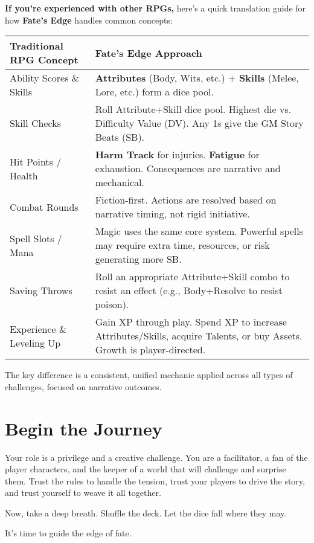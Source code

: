 \begin{tcolorbox}[enhanced, sharp corners, boxrule=1pt, colback=blue!5!white, colframe=blue!75!black, title={A Guide for Veterans: Fate's Edge in a Nutshell}]
\textbf{If you're experienced with other RPGs,} here's a quick translation guide for how \textbf{Fate's Edge} handles common concepts:

\begin{center}
\begin{tabular}{|p{6cm}|p{6cm}|}
\hline
\textbf{Traditional RPG Concept} & \textbf{Fate's Edge Approach} \\
\hline
Ability Scores \& Skills & \textbf{Attributes} (Body, Wits, etc.) + \textbf{Skills} (Melee, Lore, etc.) form a dice pool. \\
\hline
Skill Checks & Roll Attribute+Skill dice pool. Highest die vs. Difficulty Value (DV). Any 1s give the GM Story Beats (SB). \\
\hline
Hit Points / Health & \textbf{Harm Track} for injuries. \textbf{Fatigue} for exhaustion. Consequences are narrative and mechanical. \\
\hline
Combat Rounds & Fiction-first. Actions are resolved based on narrative timing, not rigid initiative. \\
\hline
Spell Slots / Mana & Magic uses the same core system. Powerful spells may require extra time, resources, or risk generating more SB. \\
\hline
Saving Throws & Roll an appropriate Attribute+Skill combo to resist an effect (e.g., Body+Resolve to resist poison). \\
\hline
Experience \& Leveling Up & Gain XP through play. Spend XP to increase Attributes/Skills, acquire Talents, or buy Assets. Growth is player-directed. \\
\hline
\end{tabular}
\end{center}

The key difference is a consistent, unified mechanic applied across all types of challenges, focused on narrative outcomes.
\end{tcolorbox}

\section*{Begin the Journey}

Your role is a privilege and a creative challenge. You are a facilitator, a fan of the player characters, and the keeper of a world that will challenge and surprise them. Trust the rules to handle the tension, trust your players to drive the story, and trust yourself to weave it all together.

Now, take a deep breath. Shuffle the deck. Let the dice fall where they may.

It's time to guide the edge of fate.